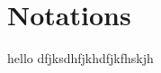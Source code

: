 \chapter{Notations}

hello dfjksdhfjkhdfjkfhskjh

\begin{comment}

\begin{table}[t]
    \vspace*{-10cm}
    \centering
    \begin{tabular}{@{}l|c@{}}
        \toprule
        Total number of tasks              & $T$                                      \\
        Current task                       & $t$                                      \\
        Current classes                    & $\mcC^t$                                 \\
        Previous classes                   & $\mcC^{1:t-1}$                           \\
        Future classes                     & $\mcC^{t+1:T}$                           \\
        Cardinality of a set of classes    & $\mcN^t=\operatorname{card}(\mcC^{t})-1$ \\
        Image and label maps at task $t$   & $\vx^t$ and $\y^t$                       \\
        Feature extractor at task $t$      & $f^t(\cdot)$                             \\
        Classifier at task $t$             & $g^t(\cdot)$                             \\
        Learnable parameters at task $t$   & $\Phi^t$                                 \\
        Predicted labels                   & $\hat{y}^t$                              \\
        Intermediary features at level $l$ & $f^t_l,\,l \in \{1, \dots, L\}$          \\
        \bottomrule
    \end{tabular}
    \caption{Notations used in this paper.}
    \label{tab:related_notation}
\end{table}

\end{comment}
